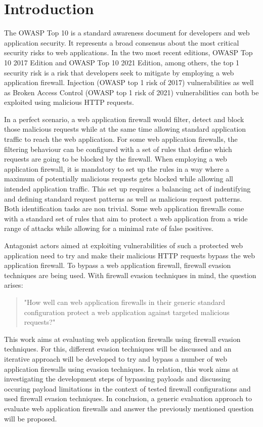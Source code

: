 \section{Introduction}
The OWASP Top 10 is a standard awareness document for developers and web application security. It represents a broad consensus about the most critical security risks to web applications. \cite{OWASP/Top10} In the two most recent editions, OWASP Top 10 2017 Edition and OWASP Top 10 2021 Edition, among others, the top 1 security risk is a risk that developers seek to mitigate by employing a web application firewall. \cite{OWASP/Risks2017,OWASP/Risks2021} Injection (OWASP top 1 risk of 2017) vulnerabilities as well as Broken Access Control (OWASP top 1 risk of 2021) vulnerabilities can both be exploited using malicious HTTP requests. \cite{OWASP/Injection,OWASP/BrokenAccessControl}

In a perfect scenario, a web application firewall would filter, detect and block those malicious requests while at the same time allowing standard application traffic to reach the web application. For some web application firewalls, the filtering behaviour can be configured with a set of rules that define which requests are going to be blocked by the firewall. \cite{OWASP/CRS,wargio/naxsiRules,Cisco/SnortRulesDocs}
When employing a web application firewall, it is mandatory to set up the rules in a way where a maximum of potentially malicious requests gets blocked while allowing all intended application traffic. This set up requires a balancing act of indentifying and defining standard request patterns as well as malicious request patterns. Both identification tasks are non trivial. Some web application firewalls come with a standard set of rules that aim to protect a web application from a wide range of attacks while allowing for a minimal rate of false positives. \cite{OWASP/CRS,wargio/naxsiRules,Cisco/SnortRulesDownload}

Antagonist actors aimed at exploiting vulnerabilities of such a protected web application need to try and make their malicious HTTP requests bypass the web application firewall. To bypass a web application firewall, firewall evasion techniques are being used. \cite{HackTricks/WAFBypass} With firewall evasion techniques in mind, the question arises: 
\begin{quote} "How well can web application firewalls in their generic standard configuration protect a web application against targeted malicious requests?" 
\end{quote}
This work aims at evaluating web application firewalls using firewall evasion techniques. For this, different evasion techniques will be discussed and an iterative approach will be developed to try and bypass a number of web application firewalls using evasion techniques. In relation, this work aims at investigating the development steps of bypassing payloads and discussing occuring payload limitations in the context of tested firewall configurations and used firewall evasion techniques. In conclusion, a generic evaluation approach to evaluate web application firewalls and answer the previously mentioned question will be proposed.
